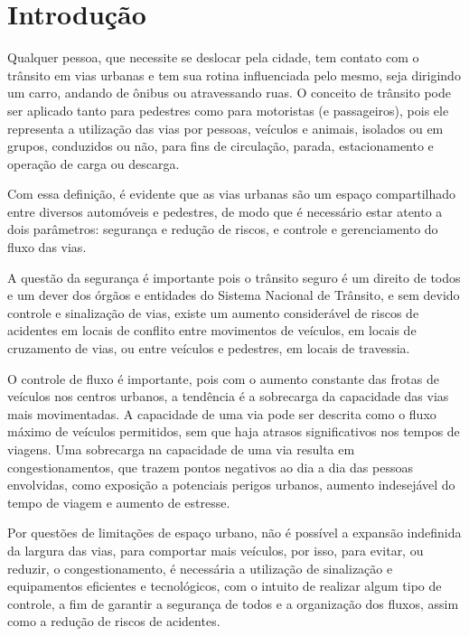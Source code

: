 \chapter{Introdução}

Qualquer pessoa, que necessite se deslocar pela cidade, tem contato com o trânsito em vias urbanas e tem sua rotina influenciada pelo mesmo, seja dirigindo um carro, andando de ônibus ou atravessando ruas. O conceito de trânsito pode ser aplicado tanto para pedestres como para motoristas (e passageiros), pois ele representa a utilização das vias por pessoas, veículos e animais, isolados ou em grupos, conduzidos ou não, para fins de circulação, parada, estacionamento e operação de carga ou descarga.

Com essa definição, é evidente que as vias urbanas são um espaço compartilhado entre diversos automóveis e pedestres, de modo que é necessário estar atento a dois parâmetros: segurança e redução de riscos, e controle e gerenciamento do fluxo das vias.

A questão da segurança é importante pois o trânsito seguro é um direito de todos e um dever dos órgãos e entidades do Sistema Nacional de Trânsito, %
e sem devido controle e sinalização de vias, existe um aumento considerável de riscos de acidentes em locais de conflito entre movimentos de veículos, em locais de cruzamento de vias, ou entre veículos e pedestres, em locais de travessia.

O controle de fluxo é importante, pois com o aumento constante das frotas de veículos nos centros urbanos, a tendência é a sobrecarga da capacidade das vias mais movimentadas. A capacidade de uma via pode ser descrita como o fluxo máximo de veículos permitidos, sem que haja atrasos significativos nos tempos de viagens. Uma sobrecarga na capacidade de uma via resulta em congestionamentos, que trazem pontos negativos ao dia a dia das pessoas envolvidas, como exposição a potenciais perigos urbanos, aumento indesejável do tempo de viagem e aumento de estresse.

Por questões de limitações de espaço urbano, não é possível a expansão indefinida da largura das vias, para comportar mais veículos, por isso, para evitar, ou reduzir, o congestionamento, é necessária a utilização de sinalização e equipamentos eficientes e tecnológicos, com o intuito de realizar algum tipo de controle, a fim de garantir a segurança de todos e a organização dos fluxos, assim como a redução de riscos de acidentes.

